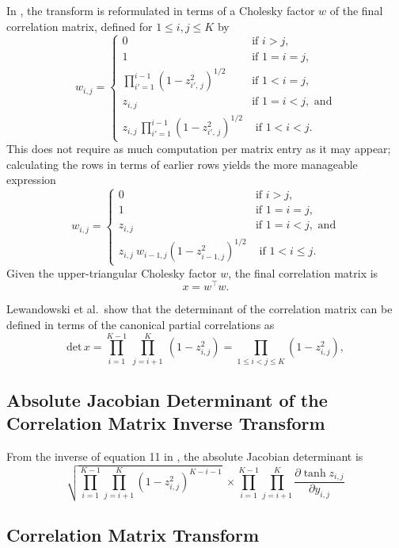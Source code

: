 In \Stan, the \LKJ transform is reformulated in terms of a Cholesky factor $w$
of the final correlation matrix, defined for $1 \leq i,j \leq K$ by
%
\[
w_{i,j} = 
\left\{
\begin{array}{cl}
%
0 & \mbox{if } i > j,
\\[4pt]
1 & \mbox{if } 1 = i = j,
\\[12pt]
\prod_{i'=1}^{i - 1} \left( 1 - z_{i'\!,\,j}^2 \right)^{1/2}
& \mbox{if } 1 < i = j,
\\[12pt]
z_{i,j} & \mbox{if } 1 = i < j, \mbox{ and}
\\[12pt]
z_{i,j} \, \prod_{i'=1}^{i-1} \left( 1 - z_{i'\!,\,j}^2 \right)^{1/2}
& \mbox{ if } 1 < i < j.
%
\end{array}
\right.
\]
%
This does not require as much computation per matrix entry as it may appear; 
calculating the rows in terms of earlier rows yields the more
manageable expression 
%
\[
w_{i,j} = 
\left\{
\begin{array}{cl}
%
0 & \mbox{if } i > j,
\\[4pt]
1 & \mbox{if } 1 = i = j, 
\\[8pt]
z_{i,j} & \mbox{if } 1 = i < j, \mbox{ and}
\\[8pt]
z_{i,j} \ w_{i-1,j} \left( 1 - z_{i-1,j}^2 \right)^{1/2}
& \mbox{ if } 1 < i \leq j.
%
\end{array}
\right.
\]
Given the upper-triangular Cholesky factor $w$, the final correlation
matrix is
\[
x = w^{\top} w.
\]

Lewandowski et al.\ show that the determinant of the correlation
matrix can be defined in terms of the canonical partial correlations
as
%
\[
\mbox{det} \, x = \prod_{i=1}^{K-1} \ \prod_{j=i+1}^K \ (1 - z_{i,j}^2)
 = \prod_{1 \leq i < j \leq K} (1 - z_{i,j}^2),
\]

\subsection{Absolute Jacobian Determinant of the Correlation
  Matrix Inverse Transform}
From the inverse of equation 11 in \cite{LewandowskiKurowickaJoe:2009},
the absolute Jacobian determinant is
%
\[
\sqrt{\prod_{i=1}^{K-1}\prod_{j=i+1}^K \left(1-z_{i,j}^2\right)^{K-i-1}} \
\times \prod_{i=1}^{K-1}\prod_{j=i+1}^K 
\frac{\partial \tanh z_{i,j}}{\partial y_{i,j}}
\]
\subsection{Correlation Matrix Transform}

